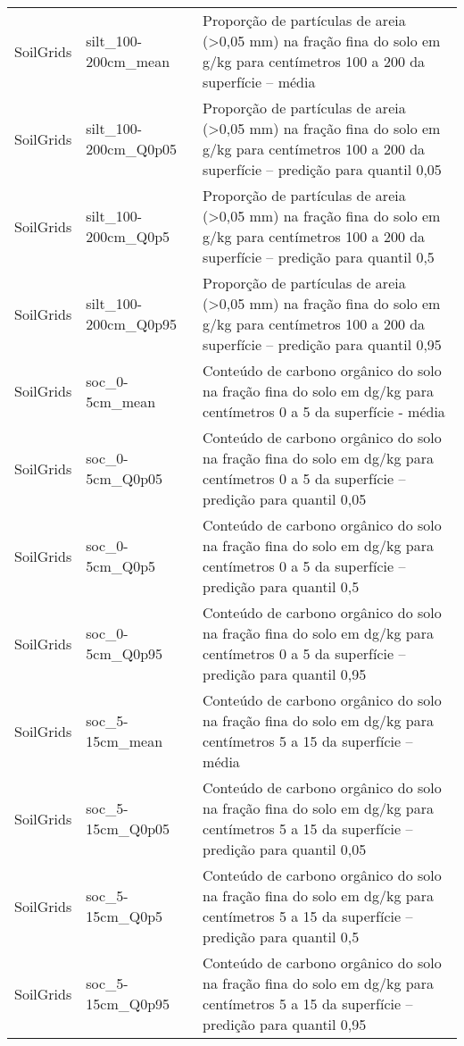 \begin{longtable}{@{} p{4cm} p{4cm} p{8cm} @{}}
	SoilGrids &
	silt\_100-200cm\_mean &
	Proporção de partículas de areia (\textgreater 0,05 mm) na fração fina do solo em g/kg para centímetros 100 a 200 da superfície – média \\
	SoilGrids &
	silt\_100-200cm\_Q0p05 &
	Proporção de partículas de areia (\textgreater 0,05 mm) na fração fina do solo em g/kg para centímetros 100 a 200 da superfície – predição para quantil 0,05 \\
	SoilGrids &
	silt\_100-200cm\_Q0p5 &
	Proporção de partículas de areia (\textgreater 0,05 mm) na fração fina do solo em g/kg para centímetros 100 a 200 da superfície – predição para quantil 0,5 \\
	SoilGrids &
	silt\_100-200cm\_Q0p95 &
	Proporção de partículas de areia (\textgreater 0,05 mm) na fração fina do solo em g/kg para centímetros 100 a 200 da superfície – predição para quantil 0,95 \\
	SoilGrids &
	soc\_0-5cm\_mean &
	Conteúdo de carbono orgânico do solo na fração fina do solo em dg/kg para centímetros 0 a 5 da superfície - média \\
	SoilGrids &
	soc\_0-5cm\_Q0p05 &
	Conteúdo de carbono orgânico do solo na fração fina do solo em dg/kg para centímetros 0 a 5 da superfície – predição para quantil 0,05 \\
	SoilGrids &
	soc\_0-5cm\_Q0p5 &
	Conteúdo de carbono orgânico do solo na fração fina do solo em dg/kg para centímetros 0 a 5 da superfície – predição para quantil 0,5 \\
	SoilGrids &
	soc\_0-5cm\_Q0p95 &
	Conteúdo de carbono orgânico do solo na fração fina do solo em dg/kg para centímetros 0 a 5 da superfície – predição para quantil 0,95 \\
	SoilGrids &
	soc\_5-15cm\_mean &
	Conteúdo de carbono orgânico do solo na fração fina do solo em dg/kg para centímetros 5 a 15 da superfície – média \\
	SoilGrids &
	soc\_5-15cm\_Q0p05 &
	Conteúdo de carbono orgânico do solo na fração fina do solo em dg/kg para centímetros 5 a 15 da superfície – predição para quantil 0,05 \\
	SoilGrids &
	soc\_5-15cm\_Q0p5 &
	Conteúdo de carbono orgânico do solo na fração fina do solo em dg/kg para centímetros 5 a 15 da superfície – predição para quantil 0,5 \\
	SoilGrids &
	soc\_5-15cm\_Q0p95 &
	Conteúdo de carbono orgânico do solo na fração fina do solo em dg/kg para centímetros 5 a 15 da superfície – predição para quantil 0,95 \\

\end{longtable}
